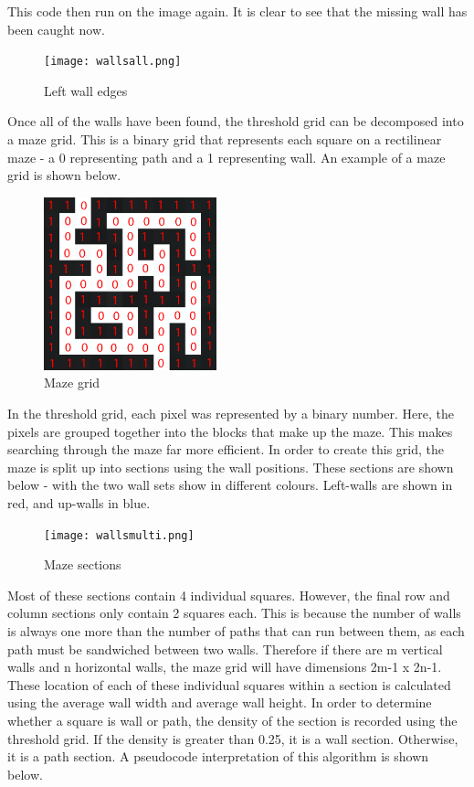 \documentclass[titlepage]{article}
\begin{document}
This code then run on the image again. It is clear to see that the missing wall has been caught now.

\begin{figure}[H]
  \centering
  \texttt{[image: wallsall.png]}
  \caption{Left wall edges}
  \label{fig:dijk}
\end{figure}

Once all of the walls have been found, the threshold grid can be decomposed into a maze grid. This is a binary grid that represents each square on a rectilinear maze - a 0 representing path and a 1 representing wall. An example of a maze grid is shown below.

\begin{figure}[H]
  \centering
  \includegraphics[width=5cm]{mazegrid.png}
  \caption{Maze grid}
  \label{fig:dijk}
\end{figure}

In the threshold grid, each pixel was represented by a binary number. Here, the pixels are grouped together into the blocks that make up the maze. This makes searching through the maze far more efficient. In order to create this grid, the maze is split up into sections using the wall positions. These sections are shown below - with the two wall sets show in different colours. Left-walls are shown in red, and up-walls in blue.

\begin{figure}[H]
  \centering
  \texttt{[image: wallsmulti.png]}
  \caption{Maze sections}
  \label{fig:dijk}
\end{figure}

Most of these sections contain 4 individual squares.  However, the final row and column sections only contain 2 squares each. This is because the number of walls is always one more than the number of paths that can run between them, as each path must be sandwiched between two walls. Therefore if there are m vertical walls and n horizontal walls, the maze grid will have dimensions 2m-1 x 2n-1. These location of each of these individual squares within a section is calculated using the average wall width and average wall height. In order to determine whether a square is wall or path, the density of the section is recorded using the threshold grid. If the density is greater than 0.25, it is a wall section. Otherwise, it is a path section. A pseudocode interpretation of this algorithm is shown below.
\end{document}
